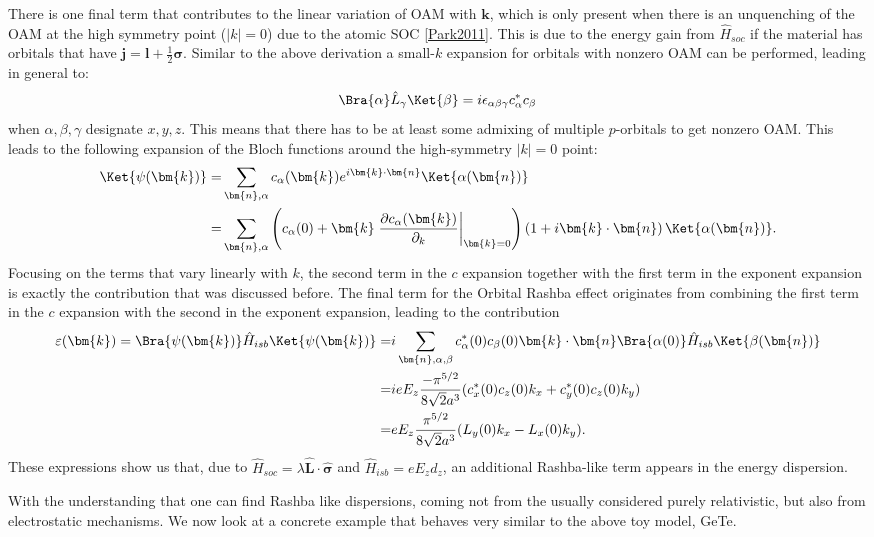There is one final term that contributes to the linear variation of OAM with $\bm{k}$, which is only present when there is an unquenching of the OAM at the high symmetry point ($|k|=0$) due to the atomic SOC \ref{Park2011}. This is due to the energy gain from $\hat{H}_{soc}$ if the material has orbitals that have $\bm{j} = \bm{l} + \frac{1}{2}\bm{\sigma}$. Similar to the above derivation a small-$k$ expansion for orbitals with nonzero OAM can be performed, leading in general to:
\begin{equation}
	\Bra{\alpha} \hat{L}_{\gamma} \Ket{\beta} = i \epsilon_{\alpha \beta \gamma} c^*_\alpha c_\beta
\end{equation}
when $\alpha,\beta,\gamma$ designate $x,y,z$. This means that there has to be at least some admixing of multiple $p$-orbitals to get nonzero OAM. This leads to the following expansion of the Bloch functions around the high-symmetry $|k|=0$ point:
\begin{align}
	\Ket{\psi(\bm{k})} =& \sum_{\bm{n},\alpha} c_\alpha(\bm{k}) e^{i \bm{k}\cdot\bm{n}}\Ket{\alpha(\bm{n})}\\
	=& \sum_{\bm{n},\alpha} \left(c_\alpha(0) + \bm{k}\left.\frac{\partial c_\alpha(\bm{k})}{\partial_k}\right\rvert_{\bm{k}=0} \right)\left(1 + i\bm{k}\cdot\bm{n}\right)\Ket{\alpha(\bm{n})}.
\end{align}
Focusing on the terms that vary linearly with $k$, the second term in the $c$ expansion together with the first term in the exponent expansion is exactly the contribution that was discussed before. The final term for the Orbital Rashba effect originates from combining the first term in the $c$ expansion with the second in the exponent expansion, leading to the contribution
\begin{align}
	\label{eq:d_z_from_OAM}
	\varepsilon(\bm{k}) = \Bra{\psi(\bm{k})} \hat{H}_{isb} \Ket{\psi(\bm{k})} =&  i\sum_{\bm{n},\alpha,\beta} c_\alpha^*(0)c_\beta(0)\bm{k}\cdot\bm{n}\Bra{\alpha(0)} \hat{H}_{isb} \Ket{\beta(\bm{n})}\\
	=&i e E_z \frac{-\pi^{5/2}}{8\sqrt{2}a^3}(c^*_x(0)c_z(0)k_x + c^*_y(0)c_z(0) k_y) \\
	=&e E_z \frac{\pi^{5/2}}{8\sqrt{2}a^3}(L_y(0)k_x - L_x(0)k_y).
\end{align}
These expressions show us that, due to ${\hat{H}_{soc} = \lambda \hat{\bm{L}}\cdot\hat{\bm{\sigma}}}$ and $\hat{H}_{isb} = e E_z d_z$, an additional Rashba-like term appears in the energy dispersion.

With the understanding that one can find Rashba like dispersions, coming not from the usually considered purely relativistic, but also from electrostatic mechanisms. We now look at a concrete example that behaves very similar to the above toy model, GeTe.

